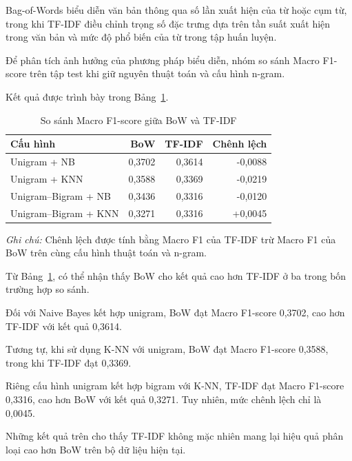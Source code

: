 Bag-of-Words biểu diễn văn bản thông qua số lần
xuất hiện của từ hoặc cụm từ, trong khi TF-IDF
điều chỉnh trọng số đặc trưng dựa trên tần suất
xuất hiện trong văn bản và mức độ phổ biến của
từ trong tập huấn luyện.

Để phân tích ảnh hưởng của phương pháp biểu diễn,
nhóm so sánh Macro F1-score trên tập test khi
giữ nguyên thuật toán và cấu hình n-gram.

Kết quả được trình bày trong
Bảng~\ref{tab:ch5-bow-tfidf}.

\begin{table}[H]
\centering
\caption{So sánh Macro F1-score giữa BoW và TF-IDF}
\label{tab:ch5-bow-tfidf}
\renewcommand{\arraystretch}{1.15}
\small

\begin{tabularx}{\textwidth}{|X|r|r|r|}
\hline
\textbf{Cấu hình}
& \textbf{BoW}
& \textbf{TF-IDF}
& \textbf{Chênh lệch} \\
\hline

Unigram + NB
& 0,3702 & 0,3614 & -0,0088 \\
\hline

Unigram + KNN
& 0,3588 & 0,3369 & -0,0219 \\
\hline

Unigram--Bigram + NB
& 0,3436 & 0,3316 & -0,0120 \\
\hline

Unigram--Bigram + KNN
& 0,3271 & 0,3316 & +0,0045 \\
\hline

\end{tabularx}
\end{table}

\noindent
\textit{Ghi chú:} Chênh lệch được tính bằng
Macro F1 của TF-IDF trừ Macro F1 của BoW
trên cùng cấu hình thuật toán và n-gram.

Từ Bảng~\ref{tab:ch5-bow-tfidf}, có thể nhận thấy
BoW cho kết quả cao hơn TF-IDF ở ba trong bốn
trường hợp so sánh.

Đối với Naive Bayes kết hợp unigram, BoW đạt
Macro F1-score 0,3702, cao hơn TF-IDF với
kết quả 0,3614.

Tương tự, khi sử dụng K-NN với unigram,
BoW đạt Macro F1-score 0,3588, trong khi
TF-IDF đạt 0,3369.

Riêng cấu hình unigram kết hợp bigram với K-NN,
TF-IDF đạt Macro F1-score 0,3316, cao hơn
BoW với kết quả 0,3271. Tuy nhiên, mức
chênh lệch chỉ là 0,0045.

Những kết quả trên cho thấy TF-IDF không
mặc nhiên mang lại hiệu quả phân loại cao
hơn BoW trên bộ dữ liệu hiện tại.

